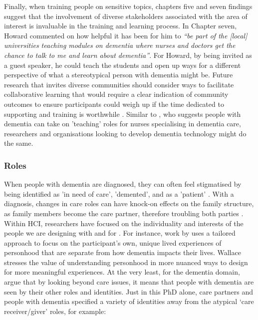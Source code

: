 Finally, when training people on sensitive topics, chapters five and seven findings suggest that the involvement of diverse stakeholders associated with the area of interest is invaluable in the training and learning process. In Chapter seven, Howard commented on how helpful it has been for him to \textit{``be part of the [local] universities teaching modules on dementia where nurses and doctors get the chance to talk to me and learn about dementia''}. For Howard, by being invited as a guest speaker, he could teach the students and open up ways for a different perspective of what a stereotypical person with dementia might be. Future research that invites diverse communities should consider ways to facilitate collaborative learning that would require a clear indication of community outcomes to ensure participants could weigh up if the time dedicated to supporting and training is worthwhile \citep{hayes2020inclusive}. Similar to \cite{skog2000patient}, who suggests people with dementia can take on 'teaching' roles for nurses specialising in dementia care, researchers and organisations looking to develop dementia technology might do the same.

\subsubsection{Roles}
\label{Roles}
When people with dementia are diagnosed, they can often feel stigmatised by being identified as ’in need of care’, ’demented’, and  as a ’patient’ \citep{benbow_dementia_2012}. With a diagnosis, changes in care roles can have knock-on effects on the family structure, as family members become the care partner, therefore troubling both parties \citep{lee_technology-based_2015}. Within HCI, researchers have focused on the individuality and interests of the people we are designing with and for \citep{lazar_rethinking_2016,brankaert_intersections_2019,foley_printer_2019,mcnaney_demyouth:_2017}. For instance, work by \cite{wallace_design-led_2013} uses a tailored approach to focus on the participant's own, unique lived experiences of personhood that are separate from how dementia impacts their lives. Wallace stresses the value of understanding personhood in more nuanced ways to design for more meaningful experiences. At the very least, for the dementia domain, \cite{bartlett2010broadening} argue that by looking beyond care issues, it means that people with dementia are seen by their other roles and identities. Just in this PhD alone, care partners and people with dementia specified a variety of identities away from the atypical `care receiver/giver' roles, for example:

